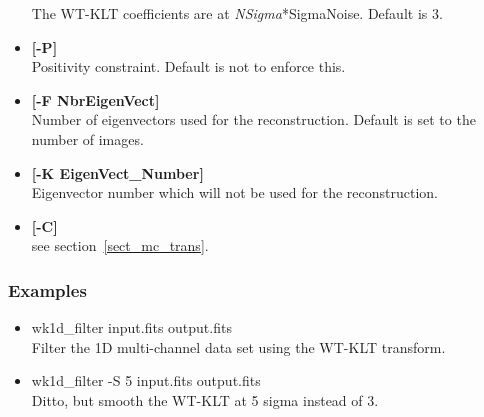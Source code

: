 \begin{itemize}
The WT-KLT coefficients are  at {\em NSigma}*SigmaNoise.
Default is  3.
\item {\bf [-P]}\\
Positivity constraint. Default is not to enforce this.
\item {\bf [-F NbrEigenVect]} \\
Number of eigenvectors used for the reconstruction. 
Default is set to the number of images.
\item {\bf [-K EigenVect\_Number]} \\
Eigenvector number which will not be used for the reconstruction. 
\item {\bf [-C]}\\
see section~\ref{sect_mc_trans}.  
\end{itemize}

\subsubsection*{Examples}
\begin{itemize}
\baselineskip=0.4truecm
\itemsep=0.1truecm
\item wk1d\_filter input.fits output.fits \\
Filter the 1D multi-channel data set using the WT-KLT transform.
\item wk1d\_filter -S 5 input.fits output.fits \\
Ditto, but smooth the WT-KLT at 5 sigma instead of 3. 
\end{itemize}

